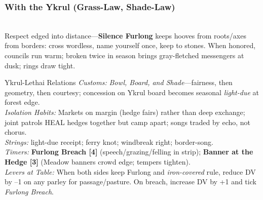 \documentclass[11pt]{book}
\begin{document}
\subsubsection*{With the Ykrul (Grass-Law, Shade-Law)} \\
Respect edged into distance---\textbf{Silence Furlong} keeps hooves from roots/axes from borders: cross wordless, name yourself once, keep to stones. When honored, councils run warm; broken twice in season brings gray-fletched messengers at dusk; rings draw tight.
\begin{atTheTable}{Ykrul-Lethai Relations}
\textit{Customs:} \emph{Bowl, Board, and Shade}---fairness, then geometry, then courtesy; concession on Ykrul board becomes seasonal \emph{light-due} at forest edge. \\
\textit{Isolation Habits:} Markets on margin (hedge fairs) rather than deep exchange; joint patrols HEAL hedges together but camp apart; songs traded by echo, not chorus. \\
\textit{Strings:} light-due receipt; ferry knot; windbreak right; border-song. \\
\textit{Timers:} \textbf{Furlong Breach [4]} (speech/grazing/felling in strip); \textbf{Banner at the Hedge [3]} (Meadow banners crowd edge; tempers tighten). \\
\textit{Levers at Table:} When both sides keep Furlong and \emph{iron-covered} rule, reduce DV by --1 on any parley for passage/pasture. On breach, increase DV by +1 and tick \emph{Furlong Breach}.
\end{atTheTable}
\end{document}
